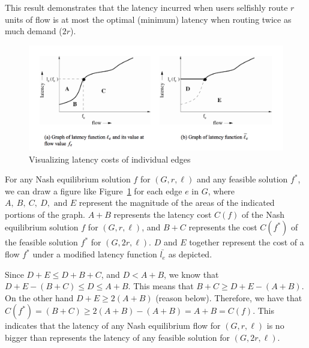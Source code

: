 \begin{proof-sketch}
    This result demonstrates that the latency incurred when users selfishly route $r$ units of flow is at most the optimal (minimum) latency when routing twice as much demand ($2r$).

\begin{figure}[t!]
    \centering
    \includegraphics[width=.7\textwidth]{graph}
    \caption{Visualizing latency costs of individual edges}
    \label{fig:thm1}
\end{figure}

    For any Nash equilibrium solution $f$ for $(G, r, \ell)$ and any feasible solution $f^*$, we can draw a figure like Figure~\ref{fig:thm1} for each edge $e$ in $G$, where $A,~B,~C,~D,\text{ and } E$ represent the magnitude of the areas of the indicated portions of the graph.
    $A+B$ represents the latency cost $C(f)$ of the Nash equilibrium solution $f$ for $(G, r, \ell)$, and $B+C$ represents the cost $C(f^*)$ of the feasible solution $f^*$ for $(G, 2r, \ell)$. $D$ and $E$ together represent the
    cost of a flow $f^*$ under a modified latency function $\bar{l_e}$ as depicted.
    
    Since $D+E \le D+B+C$, and $D < A+B$, we know that $D+E-(B+C)\le D \le A+B $. This means that $B+C\ge D+E -(A+B)$. On the other hand $D+E\ge 2(A+B)$ (reason below). Therefore, we have that $C(f^*)=(B+C)\ge 2(A+B)-(A+B)= A+B= C(f)$. 
    This indicates that the latency of any Nash equilibrium flow for $(G, r, \ell)$ is no bigger than represents the latency of any feasible solution for $(G, 2r, \ell)$.
    

\end{proof-sketch}
